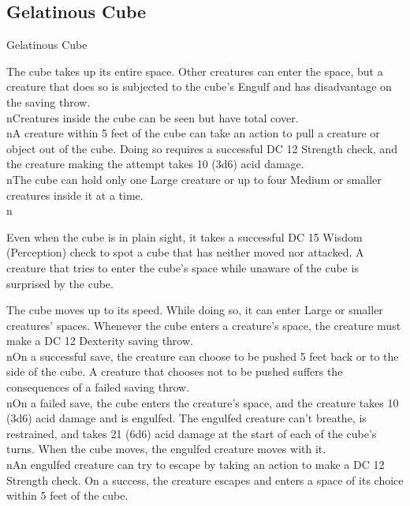\subsection{Gelatinous Cube}
\begin{DndMonster}[float*=b,width=\textwidth + 8pt]{Gelatinous Cube}
\begin{multicols}{2}
\DndMonsterBasics[armor-class={6}, hit-points={84 (8d10 + 40)}, speed={15 ft.}]
\DndMonsterDetails[saving-throws={}, skills={}, damage-immunities={}, damage-resistances={}, damage-vulnerabilities={}, condition-immunities={blinded, charmed, deafened, exhaustion, frightened, prone}, senses={blindsight 60 ft. (blind beyond this radius), passive Perception 8}, languages={—}, challenge={2 (450 XP)}]
 The cube takes up its entire space. Other creatures can enter the space, but a creature that does so is subjected to the cube’s Engulf and has disadvantage on the saving throw.\\nCreatures inside the cube can be seen but have total cover.\\nA creature within 5 feet of the cube can take an action to pull a creature or object out of the cube. Doing so requires a successful DC 12 Strength check, and the creature making the attempt takes 10 (3d6) acid damage.\\nThe cube can hold only one Large creature or up to four Medium or smaller creatures inside it at a time.\\n

 Even when the cube is in plain sight, it takes a successful DC 15 Wisdom (Perception) check to spot a cube that has neither moved nor attacked. A creature that tries to enter the cube’s space while unaware of the cube is surprised by the cube.

\DndMonsterAttack[
	name=Pseudopod,
	distance=melee,
	type=weapon,
	mod=+4,
	reach=5,
	dmg=\DndDice{3d6},
	dmg-type=acid
]
The cube moves up to its speed. While doing so, it can enter Large or smaller creatures’ spaces. Whenever the cube enters a creature’s space, the creature must make a DC 12 Dexterity saving throw.\\nOn a successful save, the creature can choose to be pushed 5 feet back or to the side of the cube. A creature that chooses not to be pushed suffers the consequences of a failed saving throw.\\nOn a failed save, the cube enters the creature’s space, and the creature takes 10 (3d6) acid damage and is engulfed. The engulfed creature can’t breathe, is restrained, and takes 21 (6d6) acid damage at the start of each of the cube’s turns. When the cube moves, the engulfed creature moves with it.\\nAn engulfed creature can try to escape by taking an action to make a DC 12 Strength check. On a success, the creature escapes and enters a space of its choice within 5 feet of the cube.
\end{multicols}
\end{DndMonster}

